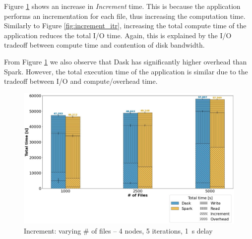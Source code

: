 \documentclass[AMA,STIX1COL]{WileyNJD-v2}
\begin{document}
Figure \ref{fig:increment_block} shows an increase in \textit{Increment} time.
This is because the application performs an incrementation for each file, thus increasing the computation time.
Similarly to Figure \ref{fig:increment_itr}, increasing the total compute time of the application reduces the total I/O time.
Again, this is explained by the I/O tradeoff between compute time and contention of disk bandwidth.
		
From Figure \ref{fig:increment_block} we also observe that Dask has significantly higher overhead than Spark.
However, the total execution time of the application is similar due to the tradeoff between I/O and compute/overhead time.
\begin{figure}[!h]
	\centering
	\includegraphics[clip,width=0.75\columnwidth]{figures/stacked_increment_block.jpg}
	\caption{Increment: varying \# of files -- 4 nodes, 5 iterations, \SI{1}{\second} delay}
	\label{fig:increment_block}
\end{figure}
						
\end{document}
